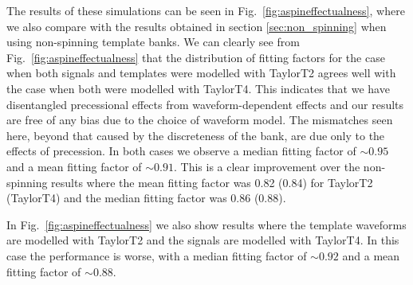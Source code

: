 The results of these simulations can be seen in 
Fig.~\ref{fig:aspineffectualness}, where we also compare with the
results obtained in section \ref{sec:non_spinning} when using non-spinning
template banks. We can clearly see from Fig.~\ref{fig:aspineffectualness} that
the distribution of fitting factors for the
case when both signals and templates were modelled with TaylorT2 agrees well
with the case when both were modelled with TaylorT4. This indicates that
we have disentangled precessional effects from waveform-dependent effects and
our results are free of any bias due to the choice of waveform model.
The mismatches seen here, beyond that caused by the discreteness of the bank,
are due only to the effects of precession.
In both cases we observe a median fitting factor of
$\sim 0.95$ and a mean fitting factor of $\sim 0.91$. This is a clear
improvement
over the non-spinning results where the mean fitting factor was 0.82 (0.84) for
TaylorT2 (TaylorT4) and the median
fitting factor was 0.86 (0.88). 

In Fig.~\ref{fig:aspineffectualness} we also show results where the template
waveforms are modelled with TaylorT2 and the signals are modelled with TaylorT4.
In this case the performance is worse, with a median fitting factor of $\sim
0.92$ and a mean fitting factor of $\sim 0.88$.

